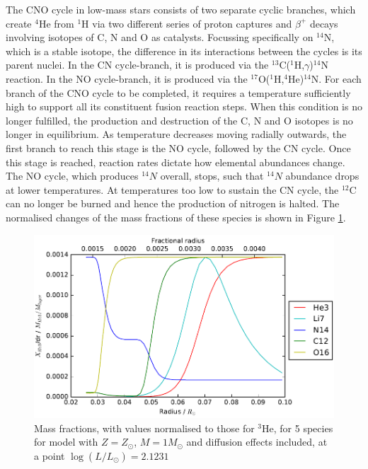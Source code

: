 \documentclass[12pt, a4paper]{report}
\begin{document}
The CNO cycle in low-mass stars consists of two separate cyclic branches, which create $^{4}$He from $^{1}$H via two different series of proton captures and $\beta ^{+}$ decays involving isotopes of C, N and O as catalysts. Focussing specifically on $^{14}$N, which is a stable isotope, the difference in its interactions between the cycles is its parent nuclei. In the CN cycle-branch, it is produced via the $^{13}$C($^{1}$H,$\gamma$)$^{14}$N reaction. In the NO cycle-branch, it is produced via the $^{17}$O($^{1}$H,$^{4}$He)$^{14}$N. For each branch of the CNO cycle to be completed, it requires a temperature sufficiently high to support all its constituent fusion reaction steps. When this condition is no longer fulfilled, the production and destruction of the C, N and O isotopes is no longer in equilibrium. As temperature decreases moving radially outwards, the first branch to reach this stage is the NO cycle, followed by the CN cycle. Once this stage is reached, reaction rates dictate how elemental abundances change. The NO cycle, which produces $^{14}N$ overall, stops, such that $^{14}N$ abundance drops at lower temperatures. At temperatures too low to sustain the CN cycle, the $^{12}$C can no longer be burned and hence the production of nitrogen is halted. The normalised changes of the mass fractions of these species is shown in Figure \ref{5specs_norm}.

\begin{figure}
\begin{center}
\includegraphics[scale=0.8]{../mu_test_data/mu_test_graphs/burning_logL=2p1231_5species.png}
\caption{Mass fractions, with values normalised to those for $^{3}$He, for 5 species for model with $Z = Z_{\odot}$, $M = 1M_{\odot}$ and diffusion effects included, at a point $\log(L/L_{\odot}) = 2.1231$}
\label{5specs_norm}
\end{center}
\end{figure}
\end{document}
